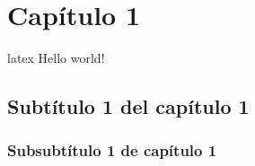 \newpage

\begin{center}
\vspace*{15em}
{\huge\bfseries\color{blue}{Capítulo 1}\par}
{\huge\bfseries\color{blue}{Primer Capítulo}\par}
\end{center}
\chapter{Capítulo 1}
\gls{latex}
Hello world!~\cite{Carpizo1998,Kelsen1969,Castro1998}
\section{Subtítulo 1 del capítulo 1}
\subsection{Subsubtítulo 1 de capítulo 1}
